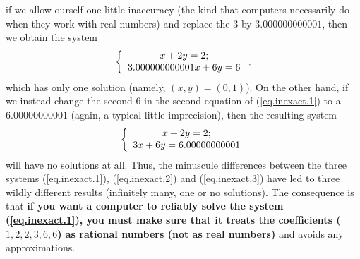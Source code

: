 \documentclass[numbers=enddot,12pt,final,onecolumn,notitlepage]{scrartcl}%
\theoremstyle{definition}
\begin{document}
\begin{itemize}
if we allow ourself one little inaccuracy (the kind that computers necessarily
do when they work with real numbers) and replace the $3$ by $3.000000000001$,
then we obtain the system%
\begin{equation}
\left\{
\begin{array}
[c]{c}%
x+2y=2;\\
3.000000000001x+6y=6
\end{array}
\right.  , \label{eq.inexact.2}%
\end{equation}
which has only one solution (namely, $\left(  x,y\right)  =\left(  0,1\right)
$). On the other hand, if we instead change the second $6$ in the second
equation of (\ref{eq.inexact.1}) to a $6.00000000001$ (again, a typical little
imprecision), then the resulting system%
\begin{equation}
\left\{
\begin{array}
[c]{c}%
x+2y=2;\\
3x+6y=6.00000000001
\end{array}
\right.  \label{eq.inexact.3}%
\end{equation}
will have no solutions at all. Thus, the minuscule differences between the
three systems (\ref{eq.inexact.1}), (\ref{eq.inexact.2}) and
(\ref{eq.inexact.3}) have led to three wildly different results (infinitely
many, one or no solutions). The consequence is that \textbf{if you want a
computer to reliably solve the system (\ref{eq.inexact.1}), you must make sure
that it treats the coefficients (}$1,2,2,3,6,6$\textbf{) as rational numbers
(not as real numbers)} and avoids any approximations.


\end{itemize}
\end{document}
